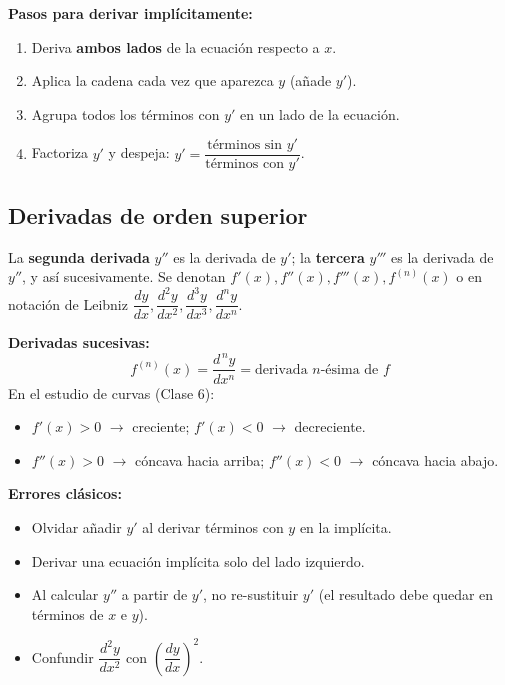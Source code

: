 \documentclass[12pt, letterpaper]{article}
\begin{document}
\begin{cuadropasos}
  \textbf{Pasos para derivar implícitamente:}
  \begin{enumerate}
    \item Deriva \textbf{ambos lados} de la ecuación respecto a $x$.
    \item Aplica la cadena cada vez que aparezca $y$ (añade $y'$).
    \item Agrupa todos los términos con $y'$ en un lado de la ecuación.
    \item Factoriza $y'$ y despeja: $y' = \dfrac{\text{términos sin } y'}{\text{términos con } y'}$.
  \end{enumerate}
\end{cuadropasos}

\subsection{Derivadas de orden superior}

La \textbf{segunda derivada} $y''$ es la derivada de $y'$; la \textbf{tercera} $y'''$ es la derivada de $y''$, y así sucesivamente. Se denotan $f'(x), f''(x), f'''(x), f^{(n)}(x)$ o en notación de Leibniz $\dfrac{dy}{dx}, \dfrac{d^2y}{dx^2}, \dfrac{d^3y}{dx^3}, \dfrac{d^ny}{dx^n}$.

\begin{cuadroteoria}
  \textbf{Derivadas sucesivas:}
  \[
    f^{(n)}(x) = \frac{d^{\,n}y}{dx^n} = \text{derivada } n\text{-ésima de } f
  \]
  En el estudio de curvas (Clase 6):
  \begin{itemize}
    \item $f'(x) > 0$ $\to$ creciente; $f'(x) < 0$ $\to$ decreciente.
    \item $f''(x) > 0$ $\to$ cóncava hacia arriba; $f''(x) < 0$ $\to$ cóncava hacia abajo.
  \end{itemize}
\end{cuadroteoria}

\begin{cuadroadvertencia}
  \textbf{Errores clásicos:}
  \begin{itemize}
    \item Olvidar añadir $y'$ al derivar términos con $y$ en la implícita.
    \item Derivar una ecuación implícita solo del lado izquierdo.
    \item Al calcular $y''$ a partir de $y'$, no re-sustituir $y'$ (el resultado debe quedar en términos de $x$ e $y$).
    \item Confundir $\dfrac{d^2y}{dx^2}$ con $\left(\dfrac{dy}{dx}\right)^2$.
  \end{itemize}
\end{cuadroadvertencia}
\end{document}

